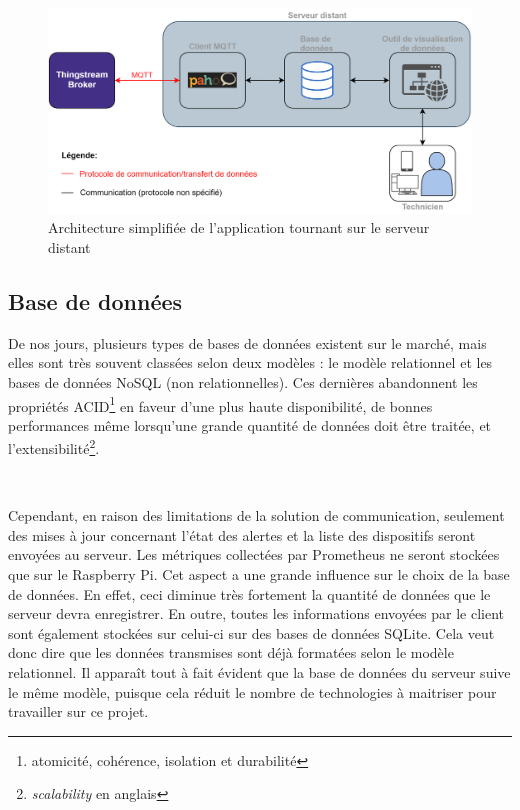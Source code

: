 \begin{figure}[ht!]
  \centering
  \includegraphics[width=\textwidth]{img/app/base_server.png}
  \caption{Architecture simplifiée de l'application tournant sur le serveur distant}
  \label{fig:base_server}
\end{figure}


\subsection{Base de données}

\noindent
De nos jours, plusieurs types de bases de données existent sur le marché, mais elles sont très souvent classées selon deux modèles : le modèle relationnel et les bases de données NoSQL (non relationnelles). Ces dernières abandonnent les propriétés ACID\footnote{atomicité, cohérence, isolation et durabilité} en faveur d’une plus haute disponibilité, de bonnes performances même lorsqu’une grande quantité de données doit être traitée, et l’extensibilité\footnote{\textit{scalability} en anglais}.

~

\noindent
Cependant, en raison des limitations de la solution de communication, seulement des mises à jour concernant l’état des alertes et la liste des dispositifs seront envoyées au serveur. Les métriques collectées par Prometheus ne seront stockées que sur le Raspberry Pi. Cet aspect a une grande influence sur le choix de la base de données. En effet, ceci diminue très fortement la quantité de données que le serveur devra enregistrer. En outre, toutes les informations envoyées par le client sont également stockées sur celui-ci sur des bases de données SQLite. Cela veut donc dire que les données transmises sont déjà formatées selon le modèle relationnel. Il apparaît tout à fait évident que la base de données du serveur suive le même modèle, puisque cela réduit le nombre de technologies à maitriser pour travailler sur ce projet.

